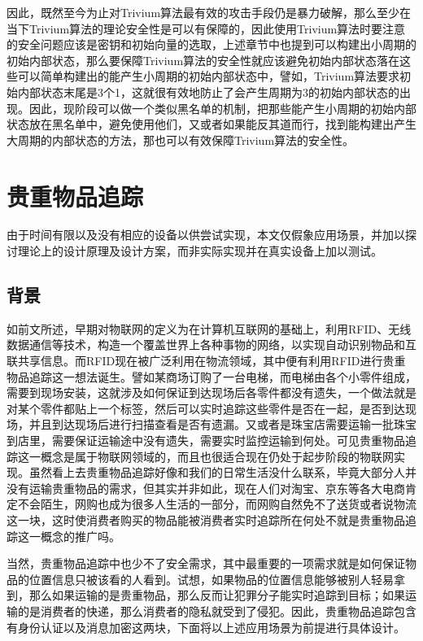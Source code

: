 因此，既然至今为止对Trivium算法最有效的攻击手段仍是暴力破解，那么至少在当下Trivium算法的理论安全性是可以有保障的，因此使用Trivium算法时要注意的安全问题应该是密钥和初始向量的选取，上述章节中也提到可以构建出小周期的初始内部状态，那么要保障Trivium算法的安全性就应该避免初始内部状态落在这些可以简单构建出的能产生小周期的初始内部状态中，譬如，Trivium算法要求初始内部状态末尾是3个1，这就很有效地防止了会产生周期为3的初始内部状态的出现。因此，现阶段可以做一个类似黑名单的机制，把那些能产生小周期的初始内部状态放在黑名单中，避免使用他们，又或者如果能反其道而行，找到能构建出产生大周期的内部状态的方法，那也可以有效保障Trivium算法的安全性。

\section{贵重物品追踪}

由于时间有限以及没有相应的设备以供尝试实现，本文仅假象应用场景，并加以探讨理论上的设计原理及设计方案，而非实际实现并在真实设备上加以测试。


\subsection{背景}

如前文所述，早期对物联网的定义为在计算机互联网的基础上，利用RFID、无线数据通信等技术，构造一个覆盖世界上各种事物的网络，以实现自动识别物品和互联共享信息。而RFID现在被广泛利用在物流领域\supercite{王丽慧2012浅析}，其中便有利用RFID进行贵重物品追踪这一想法诞生。譬如某商场订购了一台电梯，而电梯由各个小零件组成，需要到现场安装，这就涉及如何保证到达现场后各零件都没有遗失，一个做法就是对某个零件都贴上一个标签，然后可以实时追踪这些零件是否在一起，是否到达现场，并且到达现场后进行扫描查看是否有遗漏。又或者是珠宝店需要运输一批珠宝到店里，需要保证运输途中没有遗失，需要实时监控运输到何处。可见贵重物品追踪这一概念是属于物联网领域的，而且也很适合现在仍处于起步阶段的物联网实现。虽然看上去贵重物品追踪好像和我们的日常生活没什么联系，毕竟大部分人并没有运输贵重物品的需求，但其实并非如此，现在人们对淘宝、京东等各大电商肯定不会陌生，网购也成为很多人生活的一部分，而网购自然免不了送货或者说物流这一块，这时使消费者购买的物品能被消费者实时追踪所在何处不就是贵重物品追踪这一概念的推广吗。

当然，贵重物品追踪中也少不了安全需求，其中最重要的一项需求就是如何保证物品的位置信息只被该看的人看到。试想，如果物品的位置信息能够被别人轻易拿到，那么如果运输的是贵重物品，那么反而让犯罪分子能实时追踪到目标；如果运输的是消费者的快递，那么消费者的隐私就受到了侵犯。因此，贵重物品追踪包含有身份认证以及消息加密这两块，下面将以上述应用场景为前提进行具体设计。

